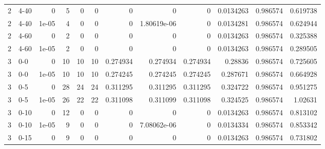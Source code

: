 \begin{tabular}{rlrrrrrrrrrr}
     2 & 4-40   &      0     &           5 &                 0 &                 0 &     0           &     0           &      0           &        0.0134263 &               0.986574 &           0.619738 \\
     2 & 4-40   &      1e-05 &           4 &                 0 &                 0 &     0           &     1.80619e-06 &      0           &        0.0134281 &               0.986574 &           0.624944 \\
     2 & 4-60   &      0     &           2 &                 0 &                 0 &     0           &     0           &      0           &        0.0134263 &               0.986574 &           0.325388 \\
     2 & 4-60   &      1e-05 &           2 &                 0 &                 0 &     0           &     0           &      0           &        0.0134263 &               0.986574 &           0.289505 \\
     3 & 0-0    &      0     &          10 &                10 &                10 &     0.274934    &     0.274934    &      0.274934    &        0.28836   &               0.986574 &           0.725605 \\
     3 & 0-0    &      1e-05 &          10 &                10 &                10 &     0.274245    &     0.274245    &      0.274245    &        0.287671  &               0.986574 &           0.664928 \\
     3 & 0-5    &      0     &          28 &                24 &                24 &     0.311295    &     0.311295    &      0.311295    &        0.324722  &               0.986574 &           0.951275 \\
     3 & 0-5    &      1e-05 &          26 &                22 &                22 &     0.311098    &     0.311099    &      0.311098    &        0.324525  &               0.986574 &           1.02631  \\
     3 & 0-10   &      0     &          12 &                 0 &                 0 &     0           &     0           &      0           &        0.0134263 &               0.986574 &           0.813102 \\
     3 & 0-10   &      1e-05 &           9 &                 0 &                 0 &     0           &     7.08062e-06 &      0           &        0.0134334 &               0.986574 &           0.853342 \\
     3 & 0-15   &      0     &           9 &                 0 &                 0 &     0           &     0           &      0           &        0.0134263 &               0.986574 &           0.731802 \\

\end{tabular}
